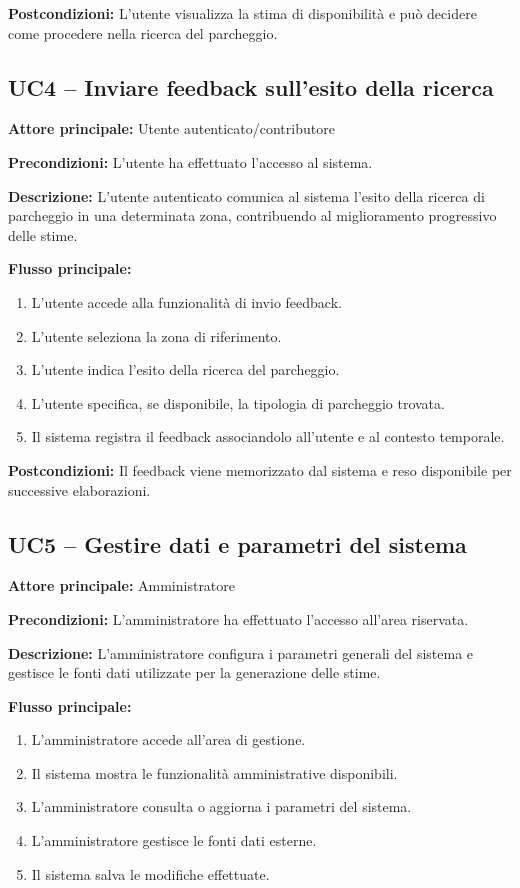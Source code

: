 \documentclass[a4paper,12pt]{article}
\begin{document}
\textbf{Postcondizioni:} L'utente visualizza la stima di disponibilità e può decidere come procedere nella ricerca del parcheggio.
\subsection*{UC4 -- Inviare feedback sull'esito della ricerca}

\textbf{Attore principale:} Utente autenticato/contributore

\textbf{Precondizioni:} L'utente ha effettuato l'accesso al sistema.

\textbf{Descrizione:}  
L'utente autenticato comunica al sistema l'esito della ricerca di parcheggio in una determinata zona, contribuendo al miglioramento progressivo delle stime.

\textbf{Flusso principale:}
\begin{enumerate}
    \item L'utente accede alla funzionalità di invio feedback.
    \item L'utente seleziona la zona di riferimento.
    \item L'utente indica l'esito della ricerca del parcheggio.
    \item L'utente specifica, se disponibile, la tipologia di parcheggio trovata.
    \item Il sistema registra il feedback associandolo all'utente e al contesto temporale.
\end{enumerate}

\textbf{Postcondizioni:} Il feedback viene memorizzato dal sistema e reso disponibile per successive elaborazioni.
\subsection*{UC5 -- Gestire dati e parametri del sistema}

\textbf{Attore principale:} Amministratore

\textbf{Precondizioni:} L'amministratore ha effettuato l'accesso all'area riservata.

\textbf{Descrizione:}  
L'amministratore configura i parametri generali del sistema e gestisce le fonti dati utilizzate per la generazione delle stime.

\textbf{Flusso principale:}
\begin{enumerate}
    \item L'amministratore accede all'area di gestione.
    \item Il sistema mostra le funzionalità amministrative disponibili.
    \item L'amministratore consulta o aggiorna i parametri del sistema.
    \item L'amministratore gestisce le fonti dati esterne.
    \item Il sistema salva le modifiche effettuate.
\end{enumerate}
\end{document}
